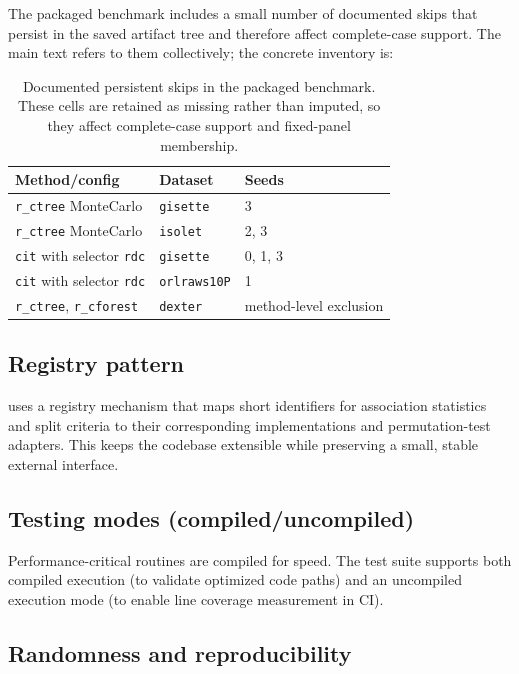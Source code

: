 The packaged benchmark includes a small number of documented skips that persist
in the saved artifact tree and therefore affect complete-case support. The main
text refers to them collectively; the concrete inventory is:

\begin{table}[t]
  \centering
  \scriptsize
  \setlength{\tabcolsep}{4pt}
  \begin{tabular}{@{}lll@{}}
    \toprule
    Method/config & Dataset & Seeds \\
    \midrule
    \texttt{r\_ctree} MonteCarlo & \texttt{gisette} & 3 \\
    \texttt{r\_ctree} MonteCarlo & \texttt{isolet} & 2, 3 \\
    \texttt{cit} with selector \texttt{rdc} & \texttt{gisette} & 0, 1, 3 \\
    \texttt{cit} with selector \texttt{rdc} & \texttt{orlraws10P} & 1 \\
    \texttt{r\_ctree}, \texttt{r\_cforest} & \texttt{dexter} & method-level exclusion \\
    \bottomrule
  \end{tabular}
  \caption{Documented persistent skips in the packaged benchmark. These cells
  are retained as missing rather than imputed, so they affect complete-case
  support and fixed-panel membership.}
  \label{tab:implementation-skips}
\end{table}

\subsection{Registry pattern}

\citrees uses a registry mechanism that maps short identifiers for association
statistics and split criteria to their corresponding implementations and
permutation-test adapters. This keeps the codebase extensible while preserving a
small, stable external interface.

\subsection{Testing modes (compiled/uncompiled)}

Performance-critical routines are compiled for speed. The test suite supports
both compiled execution (to validate optimized code paths) and an uncompiled
execution mode (to enable line coverage measurement in CI).

\subsection{Randomness and reproducibility}

